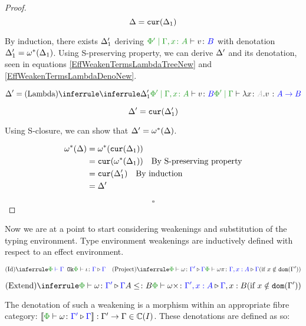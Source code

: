 \documentclass{Report}
\begin{document}
\begin{proof}
    \begin{equation}\label{EffWeakenTermsLambdaDeno}
        \Delta = \texttt{cur}(\Delta_1)\\
    \end{equation}

    By induction, there exists $\Delta_1'$ deriving $\etyperelation{\P'}{\gax}{v}{B}$ with denotation $\Delta_1' = \omega^*(\Delta_1)$. Using S-preserving property, we can derive $\Delta'$ and its denotation, seen in equations \ref{EffWeakenTermsLambdaTreeNew} and \ref{EffWeakenTermsLambdaDenoNew}.

    \begin{equation}
        \label{EffWeakenTermsLambdaTreeNew}
        \D' = \ntreeruleI{Lambda}{
            \treeruleI{\D_1'}{\etyperelation{\P'}{\gax}{v}{B}}
        }{\etyperelation{\P'}{\G}{\lam{x}{A}{v}}{\ab}}
    \end{equation}


    \begin{equation}\label{EffWeakenTermsLambdaDenoNew}
        \Delta' = \texttt{cur}(\Delta_1')\\
    \end{equation}

    Using S-closure, we can show that $\Delta' = \omega^*(\Delta)$.

    \begin{align*}
        \omega^*(\Delta) & = \omega^*(\texttt{cur}(\Delta_1))\\
        & = \texttt{cur}(\omega^*(\Delta_1))\quad\text{By S-preserving property}\\
        & = \texttt{cur}(\Delta_1')\quad\text{By induction}\\
        & = \Delta'
    \end{align*}

    $$\square$$

\end{proof}




Now we are at a point to start considering weakenings and substitution of the typing environment. Type environment weakenings are inductively defined with respect to an effect environment.


\[
    \ntreeruleI{Id}{\wellformedok{\P}{\G}}{\pewrel{\i}{\G}{\G}}
    \quad  
    \condtreeruleI{Project}{\pewrel{\w}{\G'}{\G}}{\pewrel{\w \pi}{\G, x: A}{\G}}{x \notin \dom{\G'}}
\]

\[
    \condtreeruleII{Extend}{\pewrel{\w}{\G'}{\G}}{ A \subtype B}{\pewrel{\w \x}{\G', x: A}{\G, x: B}}{x \notin \dom{\G'}}
\]

The denotation of such a weakening is a morphism within an appropriate fibre category: $\deno{\pewrel{\w}{\G'}{\G}}: \G' \rightarrow \G \in \C(I)$. These denotations are defined as so:
\end{document}
